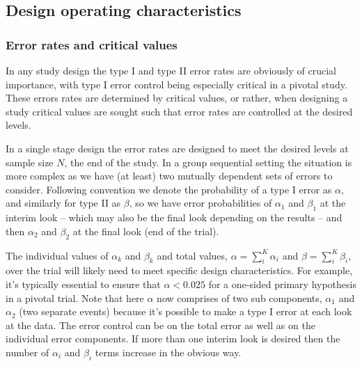 \documentclass{article}
\begin{document}
\subsection{Design operating characteristics}

\subsubsection{Error rates and critical values}
In any study design the type I and type II error rates are obviously of crucial importance, with type I error control being especially critical in a pivotal study. These errors rates are determined by critical values, or rather, when designing a study critical values are sought such that error rates are controlled at the desired levels. 

In a single stage design the error rates are designed to meet the desired levels at sample size $N$, the end of the study. In a group sequential setting the situation is more complex as we have (at least) two mutually dependent sets of errors to consider. Following convention we denote the probability of a type I error as $\alpha$, and similarly for type II as $\beta$, so we have error probabilities of $\alpha_1$ and $\beta_1$ at the interim look -- which may also be the final look depending on the results -- and then $\alpha_2$ and $\beta_2$ at the final look (end of the trial).  

The individual values of $\alpha_k$ and $\beta_k$ and total values, $\alpha=\sum^K_i{\alpha_i}$ and $\beta=\sum^K_i{ \beta_i}$, over the trial will likely need to meet specific design characteristics. For example, it's typically essential to ensure that $\alpha<0.025$ for a one-sided primary hypothesis in a pivotal trial. Note that here $\alpha$ now comprises of two sub components, $\alpha_1$ and $\alpha_2$ (two separate events) because it's possible to make a type I error at each look at the data. The error control can be on the total error as well as on the individual error components. If more than one interim look is desired then the number of $\alpha_i$ and $\beta_i$ terms increase in the obvious way.   
     
\end{document}
